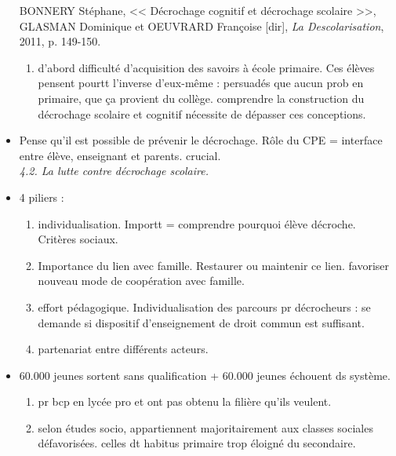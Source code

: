\documentclass[12pt]{report}
\begin{document}
\begin{itemize}
{\begin{minipage}{19cm}
BONNERY Stéphane, << Décrochage cognitif et décrochage scolaire >>, GLASMAN Dominique et OEUVRARD Françoise [dir], \textit{La Descolarisation}, 2011, p. 149-150. \\

\begin{enumerate}
\item d'abord difficulté d'acquisition des savoirs à école primaire. Ces élèves pensent pourtt l'inverse d'eux-même : persuadés que aucun prob en primaire, que ça provient du collège. comprendre la construction du décrochage scolaire et cognitif nécessite de dépasser ces conceptions.
\end{enumerate}
\end{minipage}
}

\vspace{0.5cm}

\item Pense qu'il est possible de prévenir le décrochage. Rôle du CPE =  interface entre élève, enseignant et parents. crucial. \\

\textit{4.2. La lutte contre décrochage scolaire.}

\item 4 piliers : 
\begin{enumerate}
\item individualisation. Importt = comprendre pourquoi élève décroche. Critères sociaux. \\ 
\item Importance du lien avec famille. Restaurer ou maintenir ce lien. favoriser nouveau mode de coopération avec famille. \\
\item effort pédagogique. Individualisation des parcours pr décrocheurs : se demande si dispositif d'enseignement de droit commun est suffisant. \\
\item partenariat entre différents acteurs.
 
\end{enumerate}


\item 60.000 jeunes sortent sans qualification + 60.000 jeunes échouent ds système. \\
\begin{enumerate}
\item pr bcp en lycée pro et ont pas obtenu la filière qu'ils veulent. \\
\item selon études socio, appartiennent majoritairement aux classes sociales défavorisées. celles dt habitus primaire trop éloigné du secondaire.\\
\end{enumerate}


\end{itemize}
\end{document}
